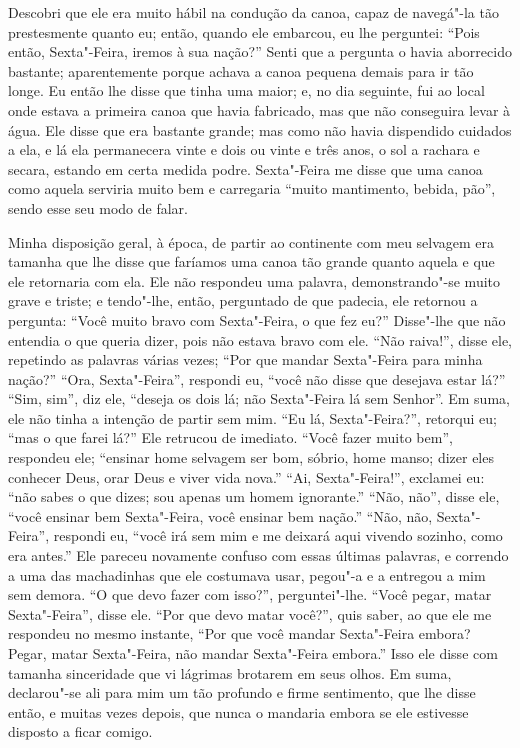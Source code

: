 Descobri que ele era muito hábil na condução da canoa, capaz de
navegá"-la tão prestesmente quanto eu; então, quando ele embarcou, eu lhe
perguntei: ``Pois então, Sexta"-Feira, iremos à sua nação?'' Senti que a
pergunta o havia aborrecido bastante; aparentemente porque achava a
canoa pequena demais para ir tão longe. Eu então lhe disse que tinha uma
maior; e, no dia seguinte, fui ao local onde estava a primeira canoa que
havia fabricado, mas que não conseguira levar à água. Ele disse que era
bastante grande; mas como não havia dispendido cuidados a ela, e lá ela
permanecera vinte e dois ou vinte e três anos, o sol a rachara e secara,
estando em certa medida podre. Sexta"-Feira me disse que uma canoa como
aquela serviria muito bem e carregaria ``muito mantimento, bebida,
pão'', sendo esse seu modo de falar.

Minha disposição geral, à época, de partir ao continente com meu
selvagem era tamanha que lhe disse que faríamos uma canoa tão grande
quanto aquela e que ele retornaria com ela. Ele não respondeu uma
palavra, demonstrando"-se muito grave e triste; e tendo"-lhe, então,
perguntado de que padecia, ele retornou a pergunta: ``Você muito bravo
com Sexta"-Feira, o que fez eu?'' Disse"-lhe que não entendia o que queria
dizer, pois não estava bravo com ele. ``Não raiva!'', disse ele,
repetindo as palavras várias vezes; ``Por que mandar Sexta"-Feira para
minha nação?'' ``Ora, Sexta"-Feira'', respondi eu, ``você não disse que
desejava estar lá?'' ``Sim, sim'', diz ele, ``deseja os dois lá; não
Sexta"-Feira lá sem Senhor''. Em suma, ele não tinha a intenção de partir
sem mim. ``Eu lá, Sexta"-Feira?'', retorqui eu; ``mas o que farei lá?''
Ele retrucou de imediato. ``Você fazer muito bem'', respondeu ele;
``ensinar home selvagem ser bom, sóbrio, home manso; dizer eles conhecer
Deus, orar Deus e viver vida nova.'' ``Ai, Sexta"-Feira!'', exclamei eu:
``não sabes o que dizes; sou apenas um homem ignorante.'' ``Não, não'',
disse ele, ``você ensinar bem Sexta"-Feira, você ensinar bem nação.''
``Não, não, Sexta"-Feira'', respondi eu, ``você irá sem mim e me deixará
aqui vivendo sozinho, como era antes.'' Ele pareceu novamente confuso
com essas últimas palavras, e correndo a uma das machadinhas que ele
costumava usar, pegou"-a e a entregou a mim sem demora. ``O que devo
fazer com isso?'', perguntei"-lhe. ``Você pegar, matar Sexta"-Feira'',
disse ele. ``Por que devo matar você?'', quis saber, ao que ele me
respondeu no mesmo instante, ``Por que você mandar Sexta"-Feira embora?
Pegar, matar Sexta"-Feira, não mandar Sexta"-Feira embora.'' Isso ele
disse com tamanha sinceridade que vi lágrimas brotarem em seus olhos. Em
suma, declarou"-se ali para mim um tão profundo e firme sentimento, que
lhe disse então, e muitas vezes depois, que nunca o mandaria embora se
ele estivesse disposto a ficar comigo.

